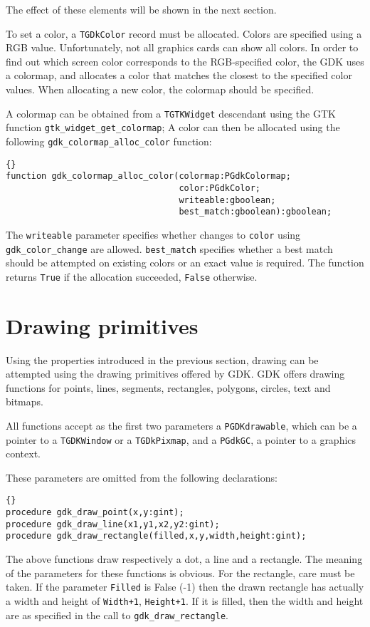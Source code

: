 \documentclass[10pt]{article}
\newcommand{\var}[1]{\texttt{#1}}
\begin{document}
The effect of these elements will be shown in the next section.

To set a color, a \var{TGDkColor} record must be allocated. Colors are
specified using a RGB value. Unfortunately, not all graphics cards can
show all colors. In order to find out which screen color corresponds 
to the RGB-specified color, the GDK uses a colormap, and allocates a
color that matches the closest to the specified color values. 
When allocating a new color, the colormap should be specified.

A colormap can be obtained from a \var{TGTKWidget} descendant using the GTK function
\var{gtk\_widget\_get\_colormap}; A color can then be allocated
using the following \var{gdk\_colormap\_alloc\_color} function:
\begin{lstlisting}{}
function gdk_colormap_alloc_color(colormap:PGdkColormap; 
                                  color:PGdkColor;
                                  writeable:gboolean; 
                                  best_match:gboolean):gboolean;
\end{lstlisting}{}
The \var{writeable} parameter specifies whether changes to
\var{color} using \var{gdk\_color\_change} are allowed. 
\var{best\_match} specifies whether a best match should be attempted 
on existing colors or an exact value is required.
The function returns \var{True} if the allocation succeeded, 
\var{False} otherwise.

\section{Drawing primitives}
Using the properties introduced in the previous section, drawing can be
attempted using the drawing primitives offered by GDK. GDK offers drawing
functions for points, lines, segments, rectangles, polygons, circles, text
and bitmaps.

All functions accept as the first two parameters a \var{PGDKdrawable}, which
can be a pointer to a \var{TGDKWindow} or a \var{TGDkPixmap}, and a 
\var{PGdkGC}, a pointer to a graphics context. 

These parameters are omitted from the following declarations:
\begin{lstlisting}{}
procedure gdk_draw_point(x,y:gint);
procedure gdk_draw_line(x1,y1,x2,y2:gint);
procedure gdk_draw_rectangle(filled,x,y,width,height:gint);
\end{lstlisting}{}
The above functions draw respectively a dot, a line and a rectangle.
The meaning of the parameters for these functions is obvious.
For the rectangle, care must be taken. If the parameter \var{Filled} is 
False (-1) then the drawn rectangle has actually a width and height of
\var{Width+1}, \var{Height+1}. If it is filled, then the width and 
height are as specified in the call to \var{gdk\_draw\_rectangle}.
\end{document}
